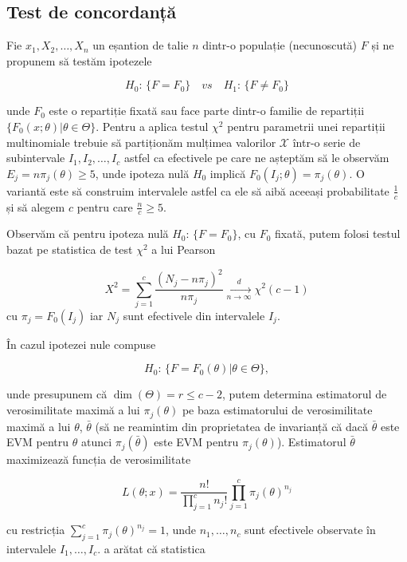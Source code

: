 \documentclass[]{article}
\begin{document}
\subsection{Test de concordanță}\label{test-de-concordanta}

Fie \(x_1,X_2,\ldots,X_n\) un eșantion de talie \(n\) dintr-o populație
(necunoscută) \(F\) și ne propunem să testăm ipotezele

\[
  H_0:\, \{F = F_0\}\quad vs\quad H_1:\,\{F\neq F_0\}
\]

unde \(F_0\) este o repartiție fixată sau face parte dintr-o familie de
repartiții \(\{F_0(x;\theta)|\theta\in\Theta\}\). Pentru a aplica testul
\(\chi^2\) pentru parametrii unei repartiții multinomiale trebuie să
partiționăm mulțimea valorilor \(\mathcal{X}\) într-o serie de
subintervale \(I_1, I_2,\ldots,I_c\) astfel ca efectivele pe care ne
așteptăm să le observăm \(E_j = n\pi_j(\theta)\geq 5\), unde ipoteza
nulă \(H_0\) implică \(F_0(I_j;\theta) = \pi_j(\theta)\). O variantă
este să construim intervalele astfel ca ele să aibă aceeași
probabilitate \(\frac{1}{c}\) și să alegem \(c\) pentru care
\(\frac{n}{c}\geq 5\).

Observăm că pentru ipoteza nulă \(H_0:\, \{F = F_0\}\), cu \(F_0\)
fixată, putem folosi testul bazat pe statistica de test \(\chi^2\) a lui
Pearson

\[
  X^2 = \sum_{j = 1}^{c}\frac{\left(N_{j} - n \pi_j\right)^2}{n \pi_j}\underset{n\to\infty}{\overset{d}{\longrightarrow}} \chi^2(c-1)
\] cu \(\pi_j = F_0(I_j)\) iar \(N_j\) sunt efectivele din intervalele
\(I_j\).

În cazul ipotezei nule compuse

\[
H_0:\, \{F = F_0(\theta)|\theta\in\Theta\},
\]

unde presupunem că \(\dim(\Theta) = r\leq c-2\), putem determina
estimatorul de verosimilitate maximă a lui \(\pi_{j}(\theta)\) pe baza
estimatorului de verosimilitate maximă a lui \(\theta\),
\(\bar{\theta}\) (să ne reamintim din proprietatea de invarianță că dacă
\(\bar{\theta}\) este EVM pentru \(\theta\) atunci
\(\pi_{j}(\bar{\theta})\) este EVM pentru \(\pi_{j}(\theta)\)).
Estimatorul \(\bar{\theta}\) maximizează funcția de verosimilitate

\[
L(\theta;x) = \frac{n!}{\prod_{j = 1}^{c} n_{j}!}\prod_{j = 1}^{c} \pi_{j}(\theta)^{n_{j}}
\]

cu restricția \(\sum_{j = 1}^{c} \pi_{j}(\theta)^{n_{j}} = 1\), unde
\(n_1,\ldots, n_c\) sunt efectivele observate în intervalele
\(I_1,\ldots, I_c\). \citep{Cramer1946} a arătat că statistica
\end{document}

